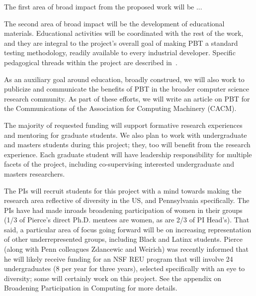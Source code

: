 


 The first area of broad impact from
the proposed work will be ...   \smallskip

%
The second area of broad impact will be the
development of educational materials. Educational activities will be
coordinated with the rest of the work, and they are integral to the
project's overall goal of making PBT a standard testing methodology,
readily available to every industrial developer.  Specific pedagogical
threads within the project are described in~.

As an auxiliary goal around education, broadly construed, we will also work to
publicize and communicate the benefits of PBT in the broader computer science
research community. As part of these efforts, we will write an article on PBT
for the Communications of the Association for Computing Machinery
(CACM). \iflater{}\fi

\smallskip
{}
%
The majority of requested funding will support formative research
experiences and mentoring for graduate students. We
also plan to work with undergraduate and masters students during this project;
they, too will benefit from the research experience. Each graduate
student will have leadership responsibility for multiple facets of the
project, including co-supervising interested undergraduate and masters
researchers.

The PIs will recruit students for this project with a mind towards making
the research area reflective of diversity in the US, and Pennsylvania specifically.
The PIs have had made inroads broadening participation of women in their
groups (1/3 of Pierce's direct Ph.D. mentees are women, as are 2/3 of PI
Head's). That said, a particular area of focus going forward will be on increasing representation of
other underrepresented groups, including Black and Latinx students. Pierce (along with Penn colleagues Zdancewic and Weirich)
was recently informed that he will likely receive funding for an
NSF REU program that will involve 24 undergraduates (8 per
year for three years), selected specifically with an eye to diversity;
some will certainly work on this project. See the appendix on Broadening Participation in Computing for more
details.

